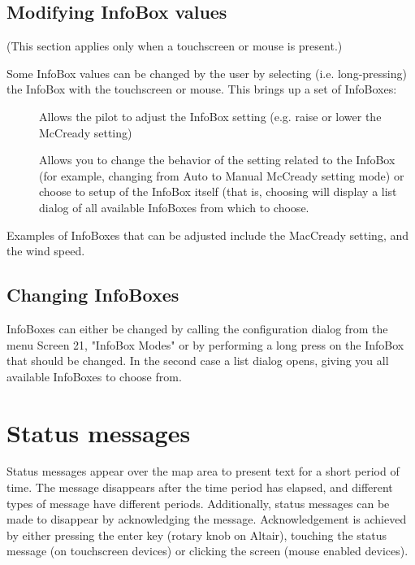 \subsection*{Modifying InfoBox values}
(This section applies only when a touchscreen or mouse is present.)

Some InfoBox values can be changed by the user by selecting (i.e. long-pressing) the
InfoBox with the touchscreen or mouse.  This brings up a set of InfoBoxes:

\begin{description}
\item[]  
  Allows the pilot to adjust the InfoBox setting (e.g. raise or lower the McCready setting)

\item[]
	Allows you to change the behavior of the setting related to the InfoBox (for example, changing from Auto to Manual McCready setting mode) or choose to setup of the InfoBox itself (that is, choosing  will display a list dialog of all available InfoBoxes from which to choose.

\end{description}


Examples of InfoBoxes that can
be adjusted include the MacCready setting, and the wind speed.

\subsection*{Changing InfoBoxes}
InfoBoxes can either be changed by calling the configuration dialog from the
menu \blink{} Screen 21, "InfoBox Modes" or by
performing a long press on the InfoBox that should be changed. In the second case a list dialog opens,
giving you all available InfoBoxes to choose from.

\section{Status messages}
Status messages appear over the map area to present text for a short period of
time.  The message disappears after the time period has elapsed, and different
types of message have different periods. Additionally, status messages can be
made to disappear by acknowledging the message.  Acknowledgement is achieved by
either pressing the enter key (rotary knob on Altair), touching the status
message (on touchscreen devices) or clicking the screen (mouse enabled devices).

